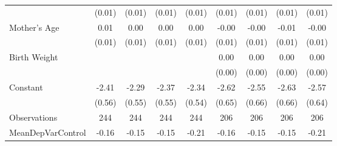 {\begin{tabular}{l*{8}{c}}
                    &      (0.01)         &      (0.01)         &      (0.01)         &      (0.01)         &      (0.01)         &      (0.01)         &      (0.01)         &      (0.01)         \\
[1em]
Mother's Age        &        0.01         &        0.00         &        0.00         &        0.00         &       -0.00         &       -0.00         &       -0.01         &       -0.00         \\
                    &      (0.01)         &      (0.01)         &      (0.01)         &      (0.01)         &      (0.01)         &      (0.01)         &      (0.01)         &      (0.01)         \\
[1em]
Birth Weight        &                     &                     &                     &                     &        0.00\sym{*}  &        0.00         &        0.00         &        0.00         \\
                    &                     &                     &                     &                     &      (0.00)         &      (0.00)         &      (0.00)         &      (0.00)         \\
[1em]
Constant            &       -2.41\sym{***}&       -2.29\sym{***}&       -2.37\sym{***}&       -2.34\sym{***}&       -2.62\sym{***}&       -2.55\sym{***}&       -2.63\sym{***}&       -2.57\sym{***}\\
                    &      (0.56)         &      (0.55)         &      (0.55)         &      (0.54)         &      (0.65)         &      (0.66)         &      (0.66)         &      (0.64)         \\
\hline
Observations        &         244         &         244         &         244         &         244         &         206         &         206         &         206         &         206         \\
MeanDepVarControl   &       -0.16         &       -0.15         &       -0.15         &       -0.21         &       -0.16         &       -0.15         &       -0.15         &       -0.21         \\
\hline\hline
\end{tabular}
}
